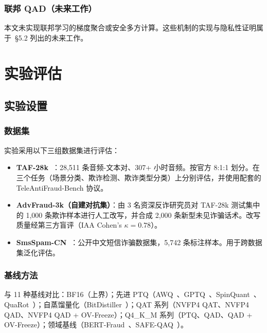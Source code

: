 \documentclass[UTF8,a4paper,10pt,twocolumn]{ctexart}
\theoremstyle{plain}
\begin{document}
\subsubsection{联邦 QAD（未来工作）}

本文未实现联邦学习的梯度聚合或安全多方计算。这些机制的实现与隐私性证明属于~\S5.2 列出的未来工作。

\section{实验评估}

\subsection{实验设置}

\subsubsection{数据集}

实验采用以下三组数据集进行评估：

\begin{itemize}
\item \textbf{TAF-28k~\cite{ma2025teleantifraud}}：28,511 条音频-文本对、307+ 小时音频。按官方 8:1:1 划分。在三个任务（场景分类、欺诈检测、欺诈类型分类）上分别评估，并使用配套的 TeleAntiFraud-Bench 协议。
\item \textbf{AdvFraud-3k（自建对抗集）}：由 3 名资深反诈研究员对 TAF-28k 测试集中的 1,000 条欺诈样本进行人工改写，并合成 2,000 条新型未见诈骗话术。改写质量经第三方盲评（IAA Cohen's $\kappa = 0.78$）。
\item \textbf{SmsSpam-CN~\cite{yang2023smsspam}}：公开中文短信诈骗数据集，5,742 条标注样本。用于跨数据集泛化评估。
\end{itemize}

\subsubsection{基线方法}

与 11 种基线对比：BF16（上界）；先进 PTQ（AWQ~\cite{lin2024awq}、GPTQ~\cite{frantar2023gptq}、SpinQuant~\cite{liu2025spinquant}、QuaRot~\cite{ashkboos2024quarot}）；自蒸馏量化（BitDistiller~\cite{du2024bitdistiller}）；QAT 系列（NVFP4 QAT、NVFP4 QAD、NVFP4 QAD + OV-Freeze）；Q4\_K\_M 系列（PTQ、QAD、QAD + OV-Freeze）；领域基线（BERT-Fraud~\cite{chen2024bert}、SAFE-QAQ~\cite{wang2026safe}）。
\end{document}
